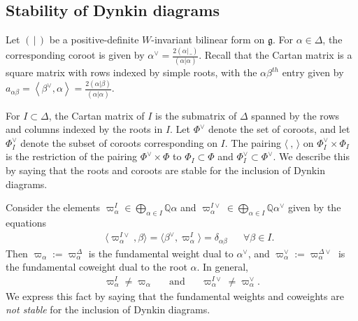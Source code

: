 \documentclass[10pt]{article}
\numberwithin{thm}{section}
\theoremstyle{definition}
\theoremstyle{remark}
\newcommand{\g}{\ensuremath{\mathfrak g}}
\newcommand{\IQ}{\mathbb Q}
\begin{document}
\subsection{Stability of Dynkin diagrams}
\label{sec:stab}

Let $(\,|\,)$ be a positive-definite $W$-invariant bilinear form on $\g$. 
For $\alpha\in\Delta$, the corresponding coroot is given by $\alpha^\vee=\frac{2(\alpha|\,\_)}{(\alpha|\alpha)}$.
Recall that the Cartan matrix is a square matrix with rows indexed by simple roots,
 with the $\alpha\beta^{th}$ entry given by $a_{\alpha\beta}=\left\langle\beta^\vee,\alpha\right\rangle=\frac{2(\alpha|\beta)}{(\alpha|\alpha)}$.


For $I\subset\Delta$, the Cartan matrix of $I$ is the submatrix of $\Delta$ spanned by  the rows and columns indexed by the roots in $I$.
Let $\Phi^\vee$ denote the set of coroots, and let $\Phi^\vee_I$ denote the subset of coroots corresponding on $I$.
The pairing $\langle\ ,\,\rangle$ on $\Phi_I^\vee\times\Phi_I$ is the restriction of the pairing $\Phi^\vee\times\Phi$
to $\Phi_I\subset\Phi$ and $\Phi^\vee_I\subset\Phi^\vee$.
We describe this by saying that the roots and coroots are stable for the inclusion of Dynkin diagrams.

Consider the elements $\varpi^I_\alpha\in\bigoplus\limits_{\alpha\in I}\IQ\alpha$ 
and $\varpi^{I\vee}_\alpha\in \bigoplus\limits_{\alpha\in I}\IQ\alpha^\vee$
given by the equations
\begin{align*}
&&\langle\varpi^{I\vee}_\alpha,\beta\rangle=\langle\beta^\vee,\varpi^I_\alpha\rangle =\delta_{\alpha\beta}&&\forall\beta\in I.
\end{align*}
Then $\varpi_\alpha:=\varpi_\alpha^\Delta$ is the fundamental weight dual to $\alpha^\vee$,
and $\varpi_\alpha^\vee:=\varpi_\alpha^{\Delta\vee}$ is the fundamental coweight dual to the root $\alpha$.
In general,
\begin{align*}
&&\varpi_\alpha^I\neq\varpi_\alpha&&
\text{and}&& 
\varpi^{I\vee}_\alpha\neq\varpi^\vee_\alpha.&&
\end{align*}
We express this fact by saying that the fundamental weights and coweights are \emph{not stable} for the inclusion of Dynkin diagrams.
\end{document}
